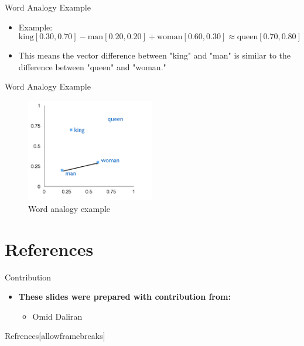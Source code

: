 \documentclass[serif, aspectratio=169]{beamer}
\begin{document}
\begin{frame}{Word Analogy Example}
    \begin{itemize}
        \item Example:
        \[
        \text{king}[0.30, 0.70] - \text{man}[0.20, 0.20] + \text{woman}[0.60, 0.30] \approx \text{queen}[0.70, 0.80]
        \]
        \item This means the vector difference between "king" and "man" is similar to the difference between "queen" and "woman."
    \end{itemize}
\end{frame}


\begin{frame}{Word Analogy Example}
	\begin{figure}
		\centering
		\includegraphics[width=0.5\textwidth]{pic/4.png}
		\caption*{Word analogy example}
	\end{figure}
\end{frame}










\section{References}

\begin{frame}{Contribution}
	\begin{itemize}
		\item \textbf{These slides were prepared with contribution from:}
		\begin{itemize}
			\item Omid Daliran
		\end{itemize}
	\end{itemize}
\end{frame}



\begin{frame}{Refrences}[allowframebreaks]
    
    
    \nocite{*}
\end{frame}
\end{document}
